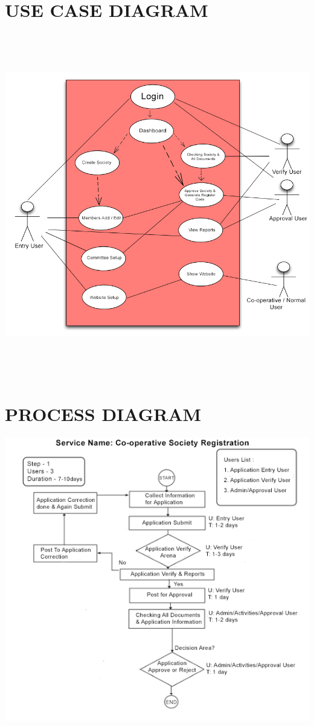 \section{USE CASE DIAGRAM}
  \includegraphics[width=14cm, height=15cm]{Chap3/2.jpg}

\section{PROCESS DIAGRAM}
  \includegraphics[width=14cm]{Chap3/3.png}



